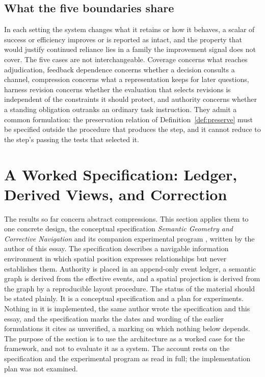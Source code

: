 \documentclass[11pt]{article}
\theoremstyle{definition}
\theoremstyle{remark}
\begin{document}
\subsection{What the five boundaries share}

In each setting the system changes what it retains or how it behaves, a scalar of success or efficiency improves or is reported as intact, and the property that would justify continued reliance lies in a family the improvement signal does not cover. The five cases are not interchangeable. Coverage concerns what reaches adjudication, feedback dependence concerns whether a decision consults a channel, compression concerns what a representation keeps for later questions, harness revision concerns whether the evaluation that selects revisions is independent of the constraints it should protect, and authority concerns whether a standing obligation outranks an ordinary task instruction. They admit a common formulation: the preservation relation of Definition~\ref{def:preserve} must be specified outside the procedure that produces the step, and it cannot reduce to the step's passing the tests that selected it.

\section{A Worked Specification: Ledger, Derived Views, and Correction}\label{sec:spec}

The results so far concern abstract compressions. This section applies them to one concrete design, the conceptual specification \emph{Semantic Geometry and Corrective Navigation} and its companion experimental program \cite{csnav}, written by the author of this essay. The specification describes a navigable information environment in which spatial position expresses relationships but never establishes them. Authority is placed in an append-only event ledger, a semantic graph is derived from the effective events, and a spatial projection is derived from the graph by a reproducible layout procedure. The status of the material should be stated plainly. It is a conceptual specification and a plan for experiments. Nothing in it is implemented, the same author wrote the specification and this essay, and the specification marks the dates and wording of the earlier formulations it cites as unverified, a marking on which nothing below depends. The purpose of the section is to use the architecture as a worked case for the framework, and not to evaluate it as a system. The account rests on the specification and the experimental program as read in full; the implementation plan was not examined.
\end{document}
